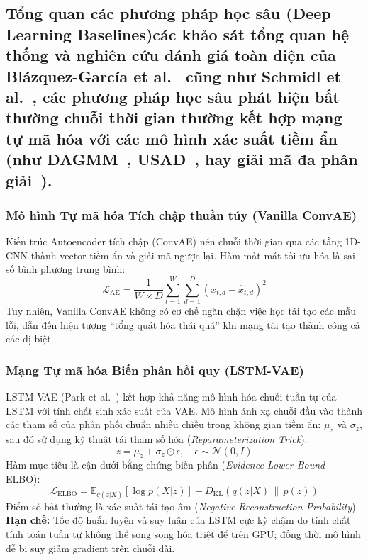 \documentclass[11pt,journal,onecolumn]{IEEEtran}
\begin{document}
\subsection{Tổng quan các phương pháp học sâu (Deep Learning Baselines)\nTheo các khảo sát tổng quan hệ thống và nghiên cứu đánh giá toàn diện của Blázquez-García et al.~\cite{blazquez2021review} cũng như Schmidl et al.~\cite{schmidl2022anomaly}, các phương pháp học sâu phát hiện bất thường chuỗi thời gian thường kết hợp mạng tự mã hóa với các mô hình xác suất tiềm ẩn (như DAGMM~\cite{zong2018deep}, USAD~\cite{audibert2020usad}, hay giải mã đa phân giải~\cite{shen2020timeseries}).}

\subsubsection{Mô hình Tự mã hóa Tích chập thuần túy (Vanilla ConvAE)}
Kiến trúc Autoencoder tích chập (ConvAE) nén chuỗi thời gian qua các tầng 1D-CNN thành vector tiềm ẩn và giải mã ngược lại.
Hàm mất mát tối ưu hóa là sai số bình phương trung bình:
\begin{equation}
\mathcal{L}_{\text{AE}} = \frac{1}{W \times D} \sum_{t=1}^W \sum_{d=1}^D (x_{t,d} - \hat{x}_{t,d})^2
\end{equation}
Tuy nhiên, Vanilla ConvAE không có cơ chế ngăn chặn việc học tái tạo các mẫu lỗi, dẫn đến hiện tượng ``tổng quát hóa thái quá'' khi mạng tái tạo thành công cả các dị biệt.

\subsubsection{Mạng Tự mã hóa Biến phân hồi quy (LSTM-VAE)}
LSTM-VAE (Park et al.~\cite{park2018multimodal}) kết hợp khả năng mô hình hóa chuỗi tuần tự của LSTM với tính chất sinh xác suất của VAE. Mô hình ánh xạ chuỗi đầu vào thành các tham số của phân phối chuẩn nhiều chiều trong không gian tiềm ẩn: $\mu_z$ và $\sigma_z$, sau đó sử dụng kỹ thuật tái tham số hóa (\textit{Reparameterization Trick}):
\begin{equation}
z = \mu_z + \sigma_z \odot \epsilon, \quad \epsilon \sim \mathcal{N}(0, I)
\end{equation}
Hàm mục tiêu là cận dưới bằng chứng biến phân (\textit{Evidence Lower Bound} -- ELBO):
\begin{equation}
\mathcal{L}_{\text{ELBO}} = \mathbb{E}_{q(z|X)}[\log p(X|z)] - D_{\text{KL}}(q(z|X) \,\|\, p(z))
\end{equation}
Điểm số bất thường là xác suất tái tạo âm (\textit{Negative Reconstruction Probability}).
\textbf{Hạn chế:} Tốc độ huấn luyện và suy luận của LSTM cực kỳ chậm do tính chất tính toán tuần tự không thể song song hóa triệt để trên GPU; đồng thời mô hình dễ bị suy giảm gradient trên chuỗi dài.
\end{document}
